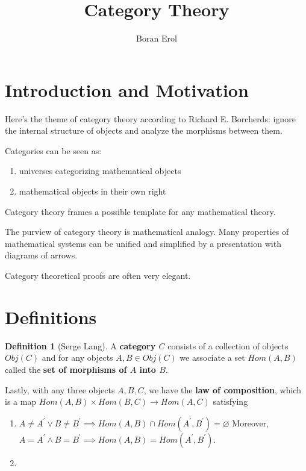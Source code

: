 \documentclass{article}
\title{Category Theory}
\author{Boran Erol}
\theoremstyle{definition}
\newtheorem{definition}{Definition}
\begin{document}
\maketitle

\section{Introduction and Motivation}

Here's the theme of category theory according to Richard E. Borcherds: ignore
the internal structure of objects and analyze the morphisms between them.

Categories can be seen as:

\begin{enumerate}
    \item universes categorizing mathematical objects
    \item mathematical objects in their own right
\end{enumerate}

Category theory frames a possible template for any mathematical theory.

The purview of category theory is mathematical analogy. Many properties
of mathematical systems can be unified and simplified by a presentation
with diagrams of arrows.

Category theoretical proofs are often very elegant.

\newpage

\section{Definitions}

\begin{definition}[Serge Lang]
    A \textbf{category $C$} consists of a collection of objects $Obj(C)$ and for any objects
    $A,B \in Obj(C)$ we associate a set $Hom(A,B)$ called the \textbf{set of morphisms of $A$
    into $B$}. 
    
    Lastly, with any three objects $A,B,C$, we have the \textbf{law of composition},
    which is a map $Hom(A,B) \times Hom(B,C) \xrightarrow{} Hom(A,C)$ satisfying

    \begin{enumerate}
        \item $A \neq A^{\prime} \lor B \neq B^{\prime} \implies Hom(A,B) \cap Hom(A^{\prime},B^{\prime}) = \varnothing$
        Moreover, $A = A^{\prime} \land B = B^{\prime} \implies Hom(A,B) = Hom(A^{\prime}, B^{\prime})$.
        \item 
    \end{enumerate}
\end{definition}
\end{document}
